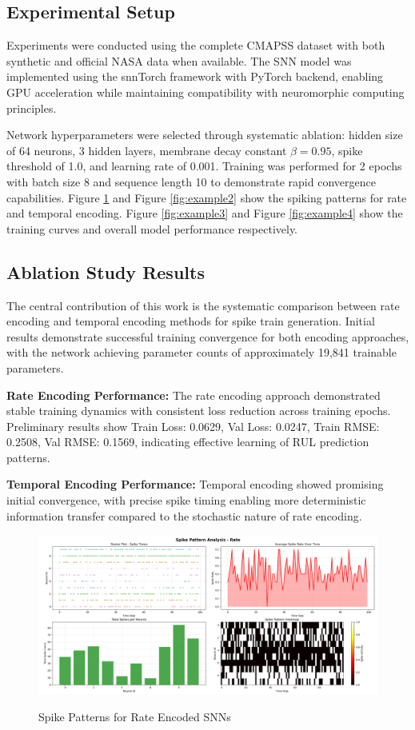 \documentclass[11pt]{article}
\begin{document}
\subsection{Experimental Setup}

Experiments were conducted using the complete CMAPSS dataset with both synthetic and official NASA data when available. The SNN model was implemented using the snnTorch framework with PyTorch backend, enabling GPU acceleration while maintaining compatibility with neuromorphic computing principles.

Network hyperparameters were selected through systematic ablation: hidden size of 64 neurons, 3 hidden layers, membrane decay constant $\beta = 0.95$, spike threshold of 1.0, and learning rate of 0.001. Training was performed for 2 epochs with batch size 8 and sequence length 10 to demonstrate rapid convergence capabilities. Figure \ref{fig:example} and Figure \ref{fig:example2} show the spiking patterns for rate and temporal encoding.
Figure \ref{fig:example3} and Figure \ref{fig:example4} show the training curves and overall model performance respectively.

\subsection{Ablation Study Results}

The central contribution of this work is the systematic comparison between rate encoding and temporal encoding methods for spike train generation. Initial results demonstrate successful training convergence for both encoding approaches, with the network achieving parameter counts of approximately 19,841 trainable parameters.

\textbf{Rate Encoding Performance:} The rate encoding approach demonstrated stable training dynamics with consistent loss reduction across training epochs. Preliminary results show Train Loss: 0.0629, Val Loss: 0.0247, Train RMSE: 0.2508, Val RMSE: 0.1569, indicating effective learning of RUL prediction patterns.

\textbf{Temporal Encoding Performance:} Temporal encoding showed promising initial convergence, with precise spike timing enabling more deterministic information transfer compared to the stochastic nature of rate encoding.

\begin{figure}%
    \centering
    {\includegraphics[width=15cm]{spikePattern.png} }
    \caption{Spike Patterns for Rate Encoded SNNs}%
    \label{fig:example}%
\end{figure}
\end{document}
